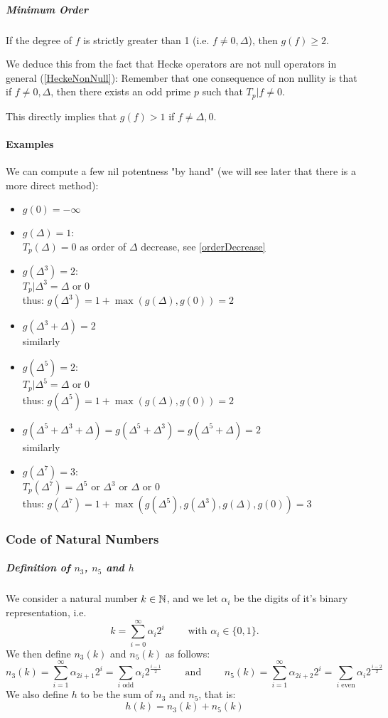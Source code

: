 \subparagraph{Minimum Order}
\label{MinimumOrderNilpotencyHeckeOperators}
If the degree of $f$ is strictly greater than 1 (i.e. $f \neq 0, \Delta$), then $g(f) \geq 2$.

We deduce this from the fact that Hecke operators are not null operators in general (\ref{HeckeNonNull}):
Remember that one consequence of non nullity is that if $f \neq 0, \Delta$, then there exists an odd prime $p$ such that $T_p|f \neq 0$.

This directly implies that $g(f) > 1$ if $f \neq \Delta, 0$.

\paragraph{Examples}
We can compute a few nil potentness "by hand" (we will see later that there is a more direct method):
\begin{itemize}
	\item $g(0) = -\infty$
	\item $g(\Delta) = 1$:\\
	$ T_p(\Delta) = 0 $
	as order of $\Delta$ decrease, see \ref{orderDecrease}
	\item $g(\Delta^3) = 2$:\\
	$ T_p|\Delta^3 = \Delta \text{ or } 0 $\\
	thus:
	$ g(\Delta^3) = 1 + \max(g(\Delta), g(0)) = 2 $
	\item $g(\Delta^3+\Delta) = 2$\\
	similarly
	\item $g(\Delta^5) = 2$:\\
	$ T_p|\Delta^5 = \Delta \text{ or } 0 $\\
	thus:
	$ g(\Delta^5) = 1 + \max(g(\Delta), g(0)) = 2 $
	\item $g(\Delta^5+\Delta^3+\Delta) = g(\Delta^5+\Delta^3) = g(\Delta^5+\Delta) = 2$\\
	similarly
	\item $g(\Delta^7) = 3$:\\
	$ T_p(\Delta^7) = \Delta^5 \text{ or } \Delta^3 \text{ or }  \Delta \text{ or } 0 $\\
	thus:
	$ g(\Delta^7) = 1 + \max(g(\Delta^5), g(\Delta^3), g(\Delta), g(0)) = 3$
\end{itemize}

\subsubsection{Code of Natural Numbers}
\subparagraph{Definition of $n_3$, $n_5$ and $h$}
We consider a natural number $k \in \mathbb{N}$, and we let $\alpha_i$ be the digits of it's binary representation, i.e.
$$
k = \sum_{i=0}^{\infty} \alpha_i 2^i \qquad \text{ with } \alpha_i \in \{ 0,1 \}.
$$
We then define $n_3(k)$ and $n_5(k)$ as follows:
$$
n_3(k) = \sum_{i=1}^{\infty} \alpha_{2i+1} 2^i = \sum_{i \text{ odd}} \alpha_i 2^{\frac{i-1}{2}}
\qquad \text{ and } \qquad
n_5(k) = \sum_{i=1}^{\infty} \alpha_{2i+2} 2^i = \sum_{i \text{ even}} \alpha_i 2^{\frac{i-2}{2}}
$$
We also define $h$ to be the sum of $n_3$ and $n_5$, that is:
$$h(k) = n_3(k) + n_5(k)$$


